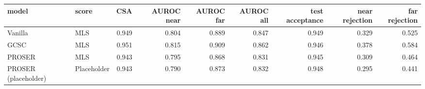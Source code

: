 \begin{tabular}{llrrrrrrr}
\toprule
model & score & CSA & AUROC near & AUROC far & AUROC all & test acceptance & near rejection & far rejection \\
\midrule
Vanilla & MLS & 0.949 & 0.804 & 0.889 & 0.847 & 0.949 & 0.329 & 0.525 \\
GCSC & MLS & 0.951 & 0.815 & 0.909 & 0.862 & 0.946 & 0.378 & 0.584 \\
PROSER & MLS & 0.943 & 0.795 & 0.868 & 0.831 & 0.945 & 0.309 & 0.464 \\
PROSER (placeholder) & Placeholder & 0.943 & 0.790 & 0.873 & 0.832 & 0.948 & 0.295 & 0.441 \\
\bottomrule
\end{tabular}
